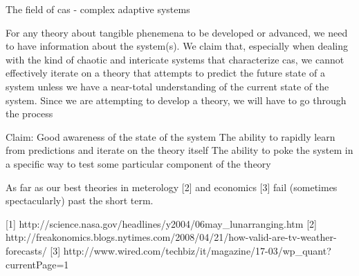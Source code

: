 The field of cas - complex adaptive systems


For any theory about tangible phenemena to be developed or advanced, we need to have information about the system(s). We claim that, especially when dealing with the kind of chaotic and intericate systems that characterize cas, we cannot effectively iterate on a theory that attempts to predict the future state of a system unless we have a near-total understanding of the current state of the system. Since we are attempting to develop a theory, we will have to go through the process

Claim:
Good awareness of the state of the system
The ability to rapidly learn from predictions and iterate on the theory itself
The ability to poke the system in a specific way to test some particular component of the theory


As far as our best theories in meterology [2] and economics [3] fail (sometimes spectacularly) past the short term.

[1] http://science.nasa.gov/headlines/y2004/06may_lunarranging.htm
[2] http://freakonomics.blogs.nytimes.com/2008/04/21/how-valid-are-tv-weather-forecasts/
[3] http://www.wired.com/techbiz/it/magazine/17-03/wp_quant?currentPage=1